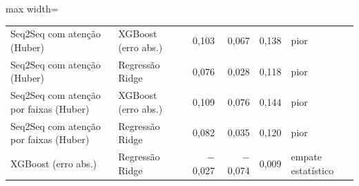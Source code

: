 \begin{table}[!htbp]
\begin{adjustbox}{max width=\textwidth}
\begin{tabular}{llrrrl}
        Seq2Seq com atenção (Huber) & XGBoost (erro abs.) & 0,103 & 0,067 & 0,138 & pior \\
        Seq2Seq com atenção (Huber) & Regressão Ridge & 0,076 & 0,028 & 0,118 & pior \\
        Seq2Seq com atenção por faixas (Huber) & XGBoost (erro abs.) & 0,109 & 0,076 & 0,144 & pior \\
        Seq2Seq com atenção por faixas (Huber) & Regressão Ridge & 0,082 & 0,035 & 0,120 & pior \\
        XGBoost (erro abs.) & Regressão Ridge & $-$0,027 & $-$0,074 & 0,009 & empate estatístico \\
        \bottomrule
    \end{tabular}
    \end{adjustbox}
\end{table}
